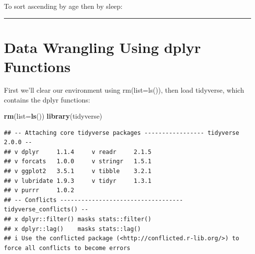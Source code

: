\documentclass[
  openany]{book}
\newenvironment{Shaded}{\begin{snugshade}}{\end{snugshade}}
\newcommand{\AttributeTok}[1]{\textcolor[rgb]{0.13,0.29,0.53}{#1}}
\newcommand{\FunctionTok}[1]{\textcolor[rgb]{0.13,0.29,0.53}{\textbf{#1}}}
\newcommand{\NormalTok}[1]{#1}
\newcommand{\OtherTok}[1]{\textcolor[rgb]{0.56,0.35,0.01}{#1}}
\newcommand{\SpecialCharTok}[1]{\textcolor[rgb]{0.81,0.36,0.00}{\textbf{#1}}}
\begin{document}
\begin{Shaded}
\end{Shaded}

To sort ascending by age then by sleep:

\begin{Shaded}
\end{Shaded}

\begin{center}\rule{0.5\linewidth}{0.5pt}\end{center}

\section{Data Wrangling Using dplyr Functions}\label{data-wrangling-using-dplyr-functions}

First we'll clear our environment using rm(list=ls()), then load tidyverse, which contains the dplyr functions:

\begin{Shaded}
\begin{Highlighting}[]
\FunctionTok{rm}\NormalTok{(}\AttributeTok{list=}\FunctionTok{ls}\NormalTok{())}
\FunctionTok{library}\NormalTok{(tidyverse)}
\end{Highlighting}
\end{Shaded}

\begin{verbatim}
## -- Attaching core tidyverse packages ----------------- tidyverse 2.0.0 --
## v dplyr     1.1.4     v readr     2.1.5
## v forcats   1.0.0     v stringr   1.5.1
## v ggplot2   3.5.1     v tibble    3.2.1
## v lubridate 1.9.3     v tidyr     1.3.1
## v purrr     1.0.2     
## -- Conflicts ----------------------------------- tidyverse_conflicts() --
## x dplyr::filter() masks stats::filter()
## x dplyr::lag()    masks stats::lag()
## i Use the conflicted package (<http://conflicted.r-lib.org/>) to force all conflicts to become errors
\end{verbatim}
\end{document}
